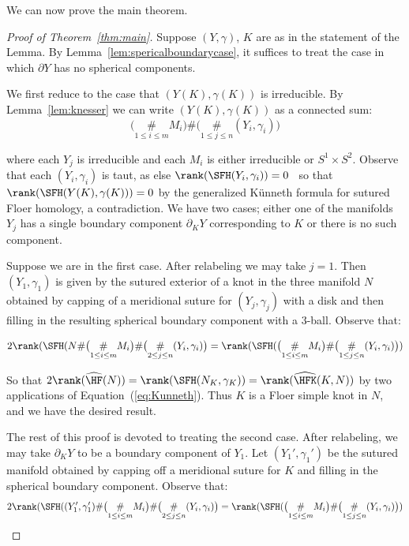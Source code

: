 \documentclass{amsart}
\theoremstyle{definition}
\theoremstyle{remark}
\numberwithin{equation}{section}
\begin{document}
We can now prove the main theorem.
\begin{proof}[Proof of Theorem~\ref{thm:main}]



  Suppose $(Y,\gamma)$, $K$ are as in the statement of the Lemma. By Lemma~\ref{lem:spericalboundarycase}, it suffices to treat the case in which $\partial Y$ has no spherical components.
  
  We first reduce to the case that $(Y(K),\gamma(K))$ is irreducible. By Lemma~\ref{lem:knesser} we can write $(Y(K),\gamma(K))$ as a connected sum:
   \begin{equation*}
      \big(\underset{1\leq i\leq m}{\#}M_i\big)\#\big(\underset{1\leq j\leq n}{\#}(Y_i,\gamma_i)\big)\end{equation*} 
      
\noindent      where each $Y_j$ is irreducible and each $M_i$ is either irreducible or $S^1\times S^2$. Observe that each $(Y_i,\gamma_i)$ is taut, as else $\rank(\SFH(Y_i,\gamma_i))=0$~\cite[Proposition 9.18]{juhasz2006holomorphic} so that $\rank(\SFH(Y(K),\gamma(K)))=0$ by the generalized K\"unneth formula for sutured Floer homology, a contradiction.  We have two cases; either one of the manifolds $Y_j$ has a single boundary component $\partial_K Y$ corresponding to $K$ or there is no such component.

   Suppose we are in the first case. After relabeling we may take $j=1$. Then $(Y_1,\gamma_1)$ is given by the sutured exterior of a knot in the three manifold $N$ obtained by capping of a meridional suture for $(Y_j,\gamma_j)$ with a disk and then filling in the resulting spherical boundary component with a $3$-ball. Observe that:

   \begin{equation*}   2\rank(\SFH(N\#\big(\underset{1\leq i\leq m}{\#}M_i\big)\#\big(\underset{2\leq j\leq n}{\#}(Y_i,\gamma_i)\big)=\rank(\SFH(\big(\underset{1\leq i\leq m}{\#}M_i\big)\#\big(\underset{1\leq j\leq n}{\#}(Y_i,\gamma_i)\big))
   \end{equation*}

  So that $2\rank(\widehat{\HF}(N))=\rank(\SFH(N_K,\gamma_K))=\rank(\widehat{\HFK}(K,N))$ by two applications of Equation~(\ref{eq:Kunneth}).
 Thus $K$ is a Floer simple knot in $N$, and we have the desired result.
 
 The rest of this proof is devoted to treating the second case. After relabeling, we may take $\partial_K Y$ to be a boundary component of $Y_1$. Let $(Y_1',\gamma_1')$ be the sutured manifold obtained by capping off a meridional suture for $K$ and filling in the spherical boundary component. Observe that:
  \begin{equation*}   2\rank(\SFH((Y_1',\gamma_1')\#\big(\underset{1\leq i\leq m}{\#}M_i\big)\#\big(\underset{2\leq j\leq n}{\#}(Y_i,\gamma_i)\big)=\rank(\SFH(\big(\underset{1\leq i\leq m}{\#}M_i\big)\#\big(\underset{1\leq j\leq n}{\#}(Y_i,\gamma_i)\big))
   \end{equation*}
 

\end{proof}
\end{document}
